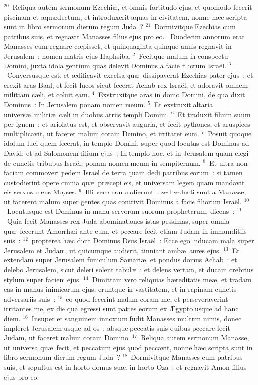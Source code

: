 ${}^{20}$~Reliqua autem sermonum Ezechi\ae , et omnis fortitudo ejus, et quomodo fecerit piscinam et aqu\ae ductum, et introduxerit aquas in civitatem, nonne h\ae c scripta sunt in libro sermonum dierum regum Juda~?
${}^{21}$~Dormivitque Ezechias cum patribus suis, et regnavit Manasses filius ejus pro eo.
~\lettrine[lines=10,image=true,loversize=0.05,lraise=-0.03]{D}{}uodecim annorum erat Manasses cum regnare cœpisset, et quinquaginta quinque annis regnavit in Jerusalem~: nomen matris ejus Haphsiba.
${}^{2}$~Fecitque malum in conspectu Domini, juxta idola gentium quas delevit Dominus a facie filiorum Isra\"el.
${}^{3}$~Conversusque est, et \ae dificavit excelsa qu\ae\ dissipaverat Ezechias pater ejus~: et erexit aras Baal, et fecit lucos sicut fecerat Achab rex Isra\"el, et adoravit omnem militiam c\ae li, et coluit eam.
${}^{4}$~Exstruxitque aras in domo Domini, de qua dixit Dominus~: In Jerusalem ponam nomen meum.
${}^{5}$~Et exstruxit altaria univers\ae\ militi\ae\ c\ae li in duobus atriis templi Domini.
${}^{6}$~Et traduxit filium suum per ignem~: et ariolatus est, et observavit auguria, et fecit pythones, et aruspices multiplicavit, ut faceret malum coram Domino, et irritaret eum.
${}^{7}$~Posuit quoque idolum luci quem fecerat, in templo Domini, super quod locutus est Dominus ad David, et ad Salomonem filium ejus~: In templo hoc, et in Jerusalem quam elegi de cunctis tribubus Isra\"el, ponam nomen meum in sempiternum.
${}^{8}$~Et ultra non faciam commoveri pedem Isra\"el de terra quam dedi patribus eorum~: si tamen custodierint opere omnia qu\ae\ pr\ae cepi eis, et universam legem quam mandavit eis servus meus Moyses.
${}^{9}$~Illi vero non audierunt~: sed seducti sunt a Manasse, ut facerent malum super gentes quas contrivit Dominus a facie filiorum Isra\"el.
${}^{10}$~Locutusque est Dominus in manu servorum suorum prophetarum, dicens~:
${}^{11}$~Quia fecit Manasses rex Juda abominationes istas pessimas, super omnia qu\ae\ fecerunt Amorrh\ae i ante eum, et peccare fecit etiam Judam in immunditiis suis~:
${}^{12}$~propterea h\ae c dicit Dominus Deus Isra\"el~: Ecce ego inducam mala super Jerusalem et Judam, ut quicumque audierit, tinniant amb\ae\ aures ejus.
${}^{13}$~Et extendam super Jerusalem funiculum Samari\ae , et pondus domus Achab~: et delebo Jerusalem, sicut deleri solent tabul\ae~: et delens vertam, et ducam crebrius stylum super faciem ejus.
${}^{14}$~Dimittam vero reliquias h\ae reditatis me\ae , et tradam eas in manus inimicorum ejus, eruntque in vastitatem, et in rapinam cunctis adversariis suis~:
${}^{15}$~eo quod fecerint malum coram me, et perseveraverint irritantes me, ex die qua egressi sunt patres eorum ex \AE gypto usque ad hanc diem.
${}^{16}$~Insuper et sanguinem innoxium fudit Manasses multum nimis, donec impleret Jerusalem usque ad os~: absque peccatis suis quibus peccare fecit Judam, ut faceret malum coram Domino.
${}^{17}$~Reliqua autem sermonum Manasse, ut universa qu\ae\ fecit, et peccatum ejus quod peccavit, nonne h\ae c scripta sunt in libro sermonum dierum regum Juda~?
${}^{18}$~Dormivitque Manasses cum patribus suis, et sepultus est in horto domus su\ae , in horto Oza~: et regnavit Amon filius ejus pro eo.


